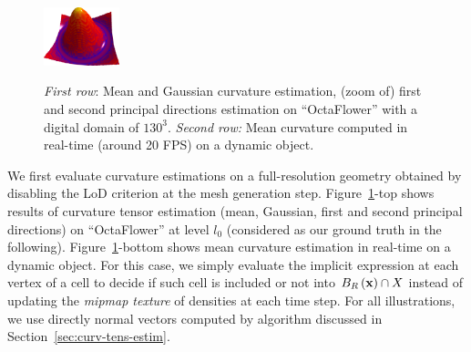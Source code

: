 \documentclass{llncs}
\begin{document}
\begin{figure}
\begin{center}
    {\includegraphics[width=2.2cm]{figs/function_mean_4}}
  \end{center}
  \vspace{-0.35cm}
  \caption{\emph{First row}: Mean and Gaussian curvature estimation, (zoom of) first and second principal directions estimation on ``OctaFlower'' with a digital domain of $130^3$.
  \emph{Second row:} Mean curvature computed in real-time (around 20 FPS) on a dynamic object.}\label{fig:full}
  \vspace{-0.35cm}
\end{figure}


We first evaluate curvature estimations on a full-resolution geometry
obtained by disabling the LoD criterion at the mesh generation step.
Figure~\ref{fig:full}-top shows results of curvature tensor estimation
(mean, Gaussian, first and second principal directions) on
``OctaFlower'' at level $l_0$ (considered as our ground truth in the
following).  Figure~\ref{fig:full}-bottom shows mean curvature
estimation in real-time on a dynamic object. For this case, we simply
evaluate the implicit expression at each vertex of a cell to decide if
such cell is included or not into $B_{R}\left(\mathbf{x}\right)\cap X$ instead
of updating the \emph{mipmap texture} of densities at each time
step. For all illustrations, we use directly normal vectors computed
by algorithm discussed in Section~\ref{sec:curv-tens-estim}.
\end{document}
